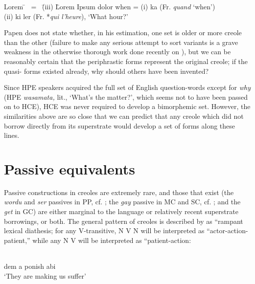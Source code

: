 \ea\label{ex:2:85} \begin{tabbing}	Lorem \= ~{\rm =}~ \= {\rm (iii)} \= Lorem Ipsum dolor \kill
					when \> {\rm =} \> {\rm (i)} \> ka {\rm (Fr. {\it quand} `when')}\\
					\> \> {\rm (ii)} \> ki ler {\rm (Fr. *{\it qui l'heure}), `What hour?'}\end{tabbing}\z
Papen does not state whether, in his estimation, one set is older or more creole than the other (failure to make any serious attempt to sort variants is a grave weakness in the otherwise thorough work done recently on ), but we can be reasonably certain that the periphrastic forms represent the original creole; if the quasi- forms existed already, why should others have been invented?

Since HPE speakers acquired the full set of English question-words except for \textit{why} (HPE \textit{wasamata,} lit., `What's the matter?', which seems not to have been passed on to HCE), HCE was never required to develop a bimorphemic set. However, the similarities above are so close that we can predict that any creole which did not borrow directly from its superstrate would develop a set of forms along these lines.

\section{Passive equivalents}

Passive constructions in creoles are extremely rare, and those that exist (the \textit{wordu} and \textit{ser} passives in PP, cf. \citealt{MarkeyEtAl1980}; the \textit{gay} passive in MC and SC, cf. \citealt{Corne1977}; and the \textit{get}  in
GC) are either marginal to the language or relatively recent super\-strate borrowings, or both. The general pattern of creoles is described by \citet{MarkeyEtAl1980} as ``rampant lexical diathesis{\textquotedbl}; for any V-transitive, N V N will be interpreted as ``actor-action-patient,'' while any N V will be interpreted as ``patient-action{\textquotedbl}:

\ea\label{ex:2:86}
 \ili{\langGC}{}{}\\
 dem a ponish abi\\
\glt `They are making us suffer'
\z


